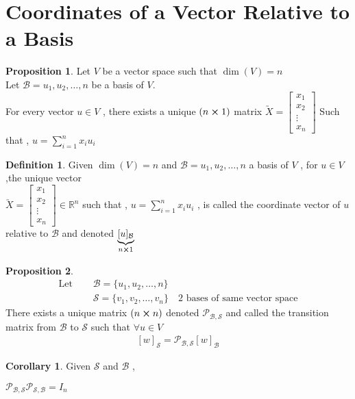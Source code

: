 \documentclass[
12pt,
]{article}
\newcommand{\un}{u_1 , u_2 , \dots , n}
\theoremstyle{definition}
\newtheorem{corollary}{Corollary}[theorem]
\theoremstyle{definition}
\theoremstyle{definition}
\newtheorem{Definition}{Definition}[section]
\theoremstyle{definition}
\newtheorem{Proposition}{Proposition}[section]
\begin{document}
\section{Coordinates of a Vector Relative to a Basis}
\begin{Proposition}
	Let $V$ be a vector space such that $\dim(V) = n$ \\
	Let $\mathcal{B} = \un $ be a basis of $V$. \\
	For every vector $u \in V$ , there exists a unique $(n \cross 1)$ matrix $\utilde{X} = 
	\begin{bmatrix}
		x_1 \\
		x_2 \\
		\vdots \\
		x_n
	\end{bmatrix}$ 
	Such that , $u = \sum_{i=1}^{n} x_i u_i$
\end{Proposition}
\begin{Definition}
	Given $\dim(V) = n$ and $\mathcal{B} = \un$ a basis of $V$ , for $u\in V$ ,the unique vector \\
	 $\utilde{X} = 
		\begin{bmatrix}
			x_1 \\
			x_2 \\
			\vdots \\
			x_n
		\end{bmatrix} \in \mathbb{R}^n $ \qquad such that , $u = \sum_{i=1}^{n} x_i u_i$ ,
		is called the coordinate vector of $u$ relative to $\mathcal{B}$ and denoted $\underbrace{[u]_{\mathcal{B}}}_{n\cross 1}$
\end{Definition}
\begin{Proposition}
	\begin{align*}
		\text{Let } \quad & \mathcal{B} = \{\un \} \\
		& \mathcal{S} = \{v_1, v_2, \dots, v_n\} \quad \text{2 bases of same vector space}
	\end{align*}
	There exists a unique matrix $(n\cross n)$ denoted $\mathcal{P}_{\mathcal{B}, \mathcal{S}}$ and called the transition matrix from $\mathcal{B}$ to $\mathcal{S}$ such that $\forall u \in V$ 
	\begin{gather*}
		\boxed{[w]_{\mathcal{S}} = \mathcal{P}_{\mathcal{B}, \mathcal{S}} [w]_{\mathcal{B}}}
	\end{gather*}
\end{Proposition}
\begin{corollary}
	Given $\mathcal{S}$ and $\mathcal{B}$ , 
	\begin{center}
		$\mathcal{P}_{\mathcal{B}, \mathcal{S}}\mathcal{P}_{\mathcal{S}, \mathcal{B}} = I_n$
	\end{center}
\end{corollary}
\end{document}

